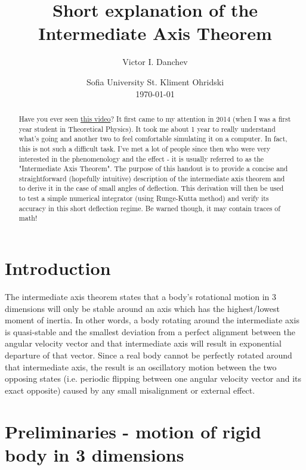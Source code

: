 \documentclass[a4paper]{article}
\title{Short explanation of the Intermediate Axis Theorem}
\author{Victor I.  Danchev}
\date{
	Sofia University St.  Kliment Ohridski \\ 
	\today
}
\begin{document}
	\maketitle
	
	\begin{abstract}
	
	Have you ever seen \href{https://www.youtube.com/watch?v=1n-HMSCDYtM}{this video}?
	It first came to my attention in 2014 (when I was a first year student in Theoretical Physics).
	It took me about 1 year to really understand what's going and another two to feel comfortable simulating it on a computer.
	In fact,  this is not such a difficult task.
	I've met a lot of people since then who were very interested in the phenomenology and the effect - it is usually referred to as the "Intermediate Axis Theorem". 
	The purpose of this handout is to provide a concise and straightforward (hopefully intuitive) description of the intermediate axis theorem and to derive it in the case of small angles of deflection. 
	This derivation will then be used to test a simple numerical integrator (using Runge-Kutta method) and verify its accuracy in this short deflection regime.
	Be warned though,  it may contain traces of math!
	\end{abstract}

	\tableofcontents
	
	\section{Introduction} \label{Intro}
	
	The intermediate axis theorem states that a body's rotational motion in 3 dimensions will only be stable around an axis which has the highest/lowest moment of inertia.
	In other words,  a body rotating around the intermediate axis is quasi-stable and the smallest deviation from a perfect alignment between the angular velocity vector and that intermediate axis will result in exponential departure of that vector.
	Since a real body cannot be perfectly rotated around that intermediate axis, the result is an oscillatory motion between the two opposing states (i.e. periodic flipping between one angular velocity vector and its exact opposite) caused by any small misalignment or external effect.	
	
	\section{Preliminaries - motion of rigid body in 3 dimensions}\label{rigid_body_dynamics}
\end{document}
